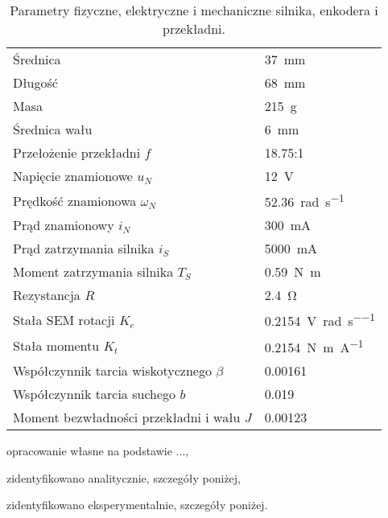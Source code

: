 \documentclass[10pt,a4paper,onecolumn]{article}
\begin{document}

\begin{table}[h]
    \centering
    \begin{threeparttable}
        \caption{Parametry fizyczne, elektryczne i mechaniczne silnika, enkodera i przekładni.}
        \label{tab:parametry_silnika}
        
        \begin{tabularx}{1\textwidth}{l | l}
            \toprule
            Średnica & \SI{37}{\milli\meter} \\
            Długość & \SI{68}{\milli\meter} \\
            Masa & \SI{215}{g} \\
            Średnica wału & \SI{6}{\milli\meter} \\
            \midrule
            Przełożenie przekładni $f$ & \num{18,75}:\num{1} \\
            \midrule
            Napięcie znamionowe $u_N$ & \SI{12}{\volt} \\
            Prędkość znamionowa $\omega_N$ & \SI{52,36}{\radian\per\second} \\
            Prąd znamionowy $i_N$ & \SI{300}{\milli\ampere} \\
            Prąd zatrzymania silnika $i_S$ & \SI{5000}{\milli\ampere} \\
            Moment zatrzymania silnika $T_S$ & \SI{0,59}{\newton\meter} \\
            \midrule
            Rezystancja\tnote{b} $R$ & \SI{2,4}{\ohm} \\
            Stała SEM rotacji\tnote{b} $K_e$ & \SI{0,2154}{\volt\per\radian\per\second} \\
            Stała momentu\tnote{b} $K_t$ & \SI{0,2154}{\newton\meter\per\ampere} \\
            Współczynnik tarcia wiskotycznego\tnote{b} $\beta$ & \num{0,00161} \\
            Współczynnik tarcia suchego\tnote{b} $b$ & \num{0,019} \\
            Moment bezwładności przekładni i wału\tnote{c} $J$ & \num{0,00123} \\
            \bottomrule
        \end{tabularx}
        
        \begin{tablenotes}
            \footnotesize
            \item[a] opracowanie własne na podstawie ...,
            \item[b] zidentyfikowano analitycznie, szczegóły poniżej,
            \item[b] zidentyfikowano eksperymentalnie, szczegóły poniżej.
        \end{tablenotes}
    \end{threeparttable}
\end{table}
\end{document}
